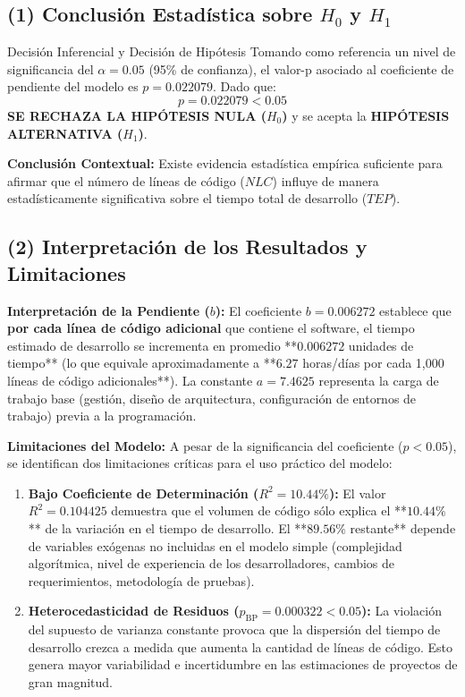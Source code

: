 \documentclass[12pt,letterpaper]{article}
\begin{document}
\subsection{(1) Conclusión Estadística sobre \texorpdfstring{$H_0$}{H0} y \texorpdfstring{$H_1$}{H1}}

\begin{summarybox}{Decisión Inferencial y Decisión de Hipótesis}
	Tomando como referencia un nivel de significancia del $\alpha = 0.05$ (95\% de confianza), el valor-p asociado al coeficiente de pendiente del modelo es $p = 0.022079$. Dado que:
	\begin{equation}
		p = 0.022079 < 0.05
	\end{equation}
	\textbf{SE RECHAZA LA HIPÓTESIS NULA ($H_0$)} y se acepta la \textbf{HIPÓTESIS ALTERNATIVA ($H_1$)}.
	
	\textbf{Conclusión Contextual:} Existe evidencia estadística empírica suficiente para afirmar que el número de líneas de código ($NLC$) influye de manera estadísticamente significativa sobre el tiempo total de desarrollo ($TEP$).
\end{summarybox}

\subsection{(2) Interpretación de los Resultados y Limitaciones}

\textbf{Interpretación de la Pendiente ($b$):}
El coeficiente $b = 0.006272$ establece que \textbf{por cada línea de código adicional} que contiene el software, el tiempo estimado de desarrollo se incrementa en promedio **$0.006272$ unidades de tiempo** (lo que equivale aproximadamente a **$6.27$ horas/días por cada 1,000 líneas de código adicionales**). La constante $a = 7.4625$ representa la carga de trabajo base (gestión, diseño de arquitectura, configuración de entornos de trabajo) previa a la programación.

\textbf{Limitaciones del Modelo:}
A pesar de la significancia del coeficiente ($p < 0.05$), se identifican dos limitaciones críticas para el uso práctico del modelo:

\begin{enumerate}
	\item \textbf{Bajo Coeficiente de Determinación ($R^2 = 10.44\%$):}
	El valor $R^2 = 0.104425$ demuestra que el volumen de código sólo explica el **$10.44\%$** de la variación en el tiempo de desarrollo. El **$89.56\%$ restante** depende de variables exógenas no incluidas en el modelo simple (complejidad algorítmica, nivel de experiencia de los desarrolladores, cambios de requerimientos, metodología de pruebas).
	\item \textbf{Heterocedasticidad de Residuos ($p_{\text{BP}} = 0.000322 < 0.05$):}
	La violación del supuesto de varianza constante provoca que la dispersión del tiempo de desarrollo crezca a medida que aumenta la cantidad de líneas de código. Esto genera mayor variabilidad e incertidumbre en las estimaciones de proyectos de gran magnitud.
\end{enumerate}
\end{document}
